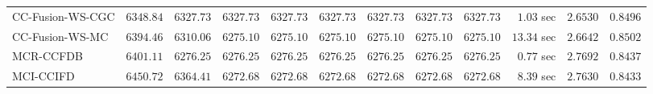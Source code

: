 \begin{table}[H]
\begin{tabular}{lrrrrrrrrrrr}
    CC-Fusion-WS-CGC & $      6348.84$ & $      6327.73$ & $      6327.73$ & $      6327.73$ & $      6327.73$ & $      6327.73$ & $      6327.73$ & $      6327.73$ & $         1.03$ sec    & $       2.6530$  & $       0.8496$ \\ 
     CC-Fusion-WS-MC & $      6394.46$ & $      6310.06$ & $      6275.10$ & $      6275.10$ & $      6275.10$ & $      6275.10$ & $      6275.10$ & $      6275.10$ & $        13.34$ sec    & $       2.6642$  & $       0.8502$ \\ 
\cmidrule{1-1} 
           MCR-CCFDB & $      6401.11$ & $      6276.25$ & $      6276.25$ & $      6276.25$ & $      6276.25$ & $      6276.25$ & $      6276.25$ & $      6276.25$ & $         0.77$ sec    & $       2.7692$  & $       0.8437$ \\ 
\cmidrule{1-1} 
           MCI-CCIFD & $      6450.72$ & $      6364.41$ & $      6272.68$ & $      6272.68$ & $      6272.68$ & $      6272.68$ & $      6272.68$ & $      6272.68$ & $         8.39$ sec    & $       2.7630$  & $       0.8433$ \\ 
\bottomrule
\end{tabular}
\end{table}

